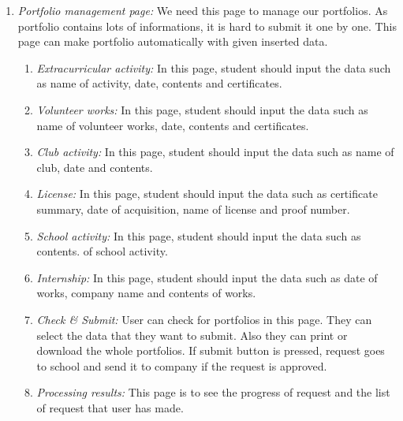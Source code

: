 \documentclass[conference]{IEEEtran}
\begin{document}
\begin{enumerate}
       \item \textit {Portfolio management page:} We need this page to manage our portfolios. As portfolio contains lots of informations, it is hard to submit it one by one. This page can make portfolio automatically with given inserted data. \\
    \begin{enumerate}
    	\item  \textit {Extracurricular activity:} In this page, student should input the data such as name of activity, date, contents and certificates. \\
        \item \textit {Volunteer works:} In this page, student should input the data such as name of volunteer works, date, contents and certificates. \\
        \item \textit {Club activity:} In this page, student should input the data such as name of club, date and contents.\\
        \item \textit {License:} In this page, student should input the data such as certificate summary, date of acquisition, name of license and proof number. \\
        \item \textit {School activity:} In this page, student should input the data such as contents. of school activity.\\
        \item \textit {Internship:} In this page, student should input the data such as date of works, company name and contents of works.\\
        \item \textit {Check \& Submit:} User can check for portfolios in this page. They can select the data that they want to submit. Also they can print or download the whole portfolios. If submit button is pressed, request goes to school and send it to company if the request is approved.\\
        \item \textit {Processing results:} This page is to see the progress of request and the list of request that user has made.\\
    \end{enumerate}
    

\end{enumerate}
\end{document}
